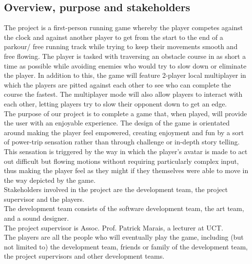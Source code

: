 \documentclass[a4paper,10pt]{article}
\begin{document}
		\subsection{Overview, purpose and stakeholders}
		The project is a first-person running game whereby the player competes against the clock and against another player to get from the start to the end of a parkour/ free running track while trying to keep their movements smooth and free flowing. The player is tasked with traversing an obstacle course in as short a time as possible while avoiding enemies who would try to slow down or eliminate the player. In addition to this, the game will feature 2-player local multiplayer in which the players are pitted against each other to see who can complete the course the fastest. The multiplayer mode will also allow players to interact with each other, letting players try to slow their opponent down to get an edge.
		\smallskip\\
		The purpose of our project is to complete a game that, when played, will provide the user with an enjoyable experience. The design of the game is orientated around making the player feel empowered, creating enjoyment and fun by a sort of power-trip sensation rather than through challenge or in-depth story telling. This sensation is triggered by the way in which the player's avatar is made to act out difficult but flowing motions without requiring particularly complex input, thus making the player feel as they might if they themselves were able to move in the way depicted by the game.
		\smallskip\\
		Stakeholders involved in the project are the development team, the project supervisor and the players. \\
		The development team consists of the software development team, the art team, and a sound designer. \\
		The project supervisor is Assoc. Prof. Patrick Marais, a lecturer at UCT. \\
		The players are all the people who will eventually play the game, including (but not limited to) the development team, friends or family of the development team, the project supervisors and other development teams.
\end{document}
